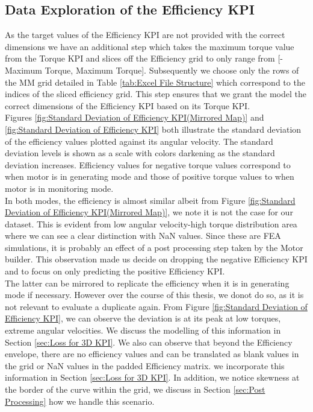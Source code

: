 \documentclass{report} %
\begin{document}
\subsection{Data Exploration of the Efficiency \ac{KPI}}\label{subsec:Deep Dive into 3D KPI}
As the target values of the Efficiency \ac{KPI} are not provided with the correct dimensions we have an additional step which takes the maximum torque value from the Torque \ac{KPI} 
and slices off the Efficiency grid to only range from [-Maximum Torque, Maximum Torque]. 
Subsequently we choose only the rows of the MM grid detailed in Table \ref{tab:Excel File Structure} which correspond to the indices of the sliced efficiency grid.
This step ensures that we grant the model the correct dimensions of the Efficiency \ac{KPI} based on its Torque \ac{KPI}.\\
Figures \ref{fig:Standard Deviation of Efficiency KPI(Mirrored Map)} and \ref{fig:Standard Deviation of Efficiency KPI} both illustrate the standard deviation 
of the efficiency values plotted against its angular velocity. The standard deviation levels is shown as a scale with colors darkening as the standard deviation increases.
Efficiency values for negative torque values correspond to when motor is in generating mode and those of positive torque values to when motor is in monitoring mode.\\
In both modes, the efficiency is almost similar albeit from Figure \ref{fig:Standard Deviation of Efficiency KPI(Mirrored Map)}, we note it is not the case for our dataset. 
This is evident from low angular velocity-high torque distribution area where we can see a clear distinction with \ac{NaN} values.
Since these are \ac{FEA} simulations, it is probably an effect of a post processing step taken by the Motor builder.
This observation made us decide on dropping the negative Efficiency \ac{KPI} and to focus on only predicting the positive Efficiency \ac{KPI}.\\
The latter can be mirrored to replicate the efficiency when it is in generating mode if necessary.
However over the course of this thesis, we donot do so, as it is not relevant to evaluate a duplicate again.
From Figure \ref{fig:Standard Deviation of Efficiency KPI}, we can observe the deviation is at its peak at low torques, extreme angular velocities. 
We discuss the modelling of this information in Section \ref{sec:Loss for 3D KPI}. 
We also can observe that beyond the Efficiency envelope, there are no efficiency values and can be translated as blank values in the grid or \ac{NaN} values in the padded Efficiency matrix.
we incorporate this information in Section \ref{sec:Loss for 3D KPI}.
In addition, we notice skewness at the border of the curve within the grid, we discuss in Section \ref{sec:Post Processing} how we handle this scenario.
\end{document}
